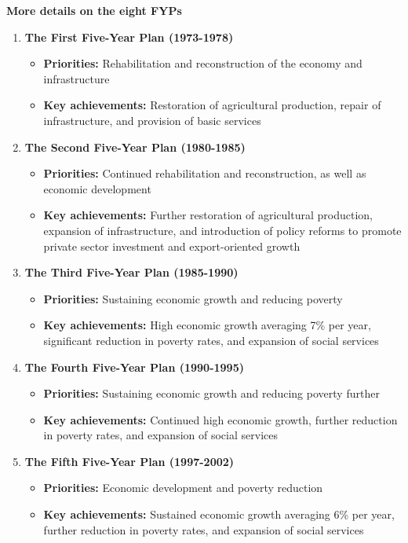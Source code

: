 \vspace{0.5cm}
\textbf{More details on the eight FYPs}
\begin{enumerate}

	\item\textbf{The First Five-Year Plan (1973-1978)}
	\begin{itemize}
		\item\textbf{Priorities:} Rehabilitation and reconstruction of the economy and infrastructure
		\item\textbf{Key achievements:} Restoration of agricultural production, repair of infrastructure, 
		and provision of basic services
	\end{itemize}
	
	\item\textbf{The Second Five-Year Plan (1980-1985)}
	\begin{itemize}
		\item\textbf{Priorities:} Continued rehabilitation and reconstruction, as well as 
		economic development
		\item\textbf{Key achievements:} Further restoration of agricultural production, 
		expansion of infrastructure, and introduction of policy reforms to promote private 
		sector investment and export-oriented growth
	\end{itemize}
	
	\item\textbf{The Third Five-Year Plan (1985-1990)}
	\begin{itemize}
		\item\textbf{Priorities:} Sustaining economic growth and reducing poverty
		\item\textbf{Key achievements:} High economic growth averaging 7\% per year, 
		significant reduction in poverty rates, and expansion of social services
	\end{itemize}
	
	\item\textbf{The Fourth Five-Year Plan (1990-1995)}
	\begin{itemize}
		\item\textbf{Priorities:} Sustaining economic growth and reducing poverty further
		\item\textbf{Key achievements:} Continued high economic growth, further reduction in 
		poverty rates, and expansion of social services
	\end{itemize}
	
	\item\textbf{The Fifth Five-Year Plan (1997-2002)}
	\begin{itemize}
		\item\textbf{Priorities:} Economic development and poverty reduction
		\item\textbf{Key achievements:} Sustained economic growth averaging 6\% per year, 
		further reduction in poverty rates, and expansion of social services
	\end{itemize}
	

\end{enumerate}
